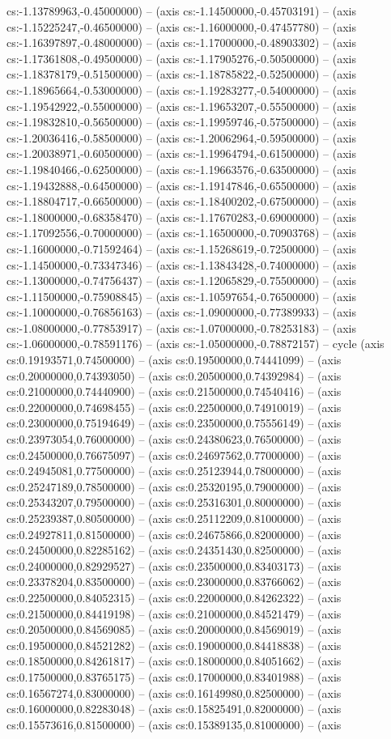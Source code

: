 cs:-1.13789963,-0.45000000) -- (axis cs:-1.14500000,-0.45703191) -- (axis cs:-1.15225247,-0.46500000) -- (axis cs:-1.16000000,-0.47457780) -- (axis cs:-1.16397897,-0.48000000) -- (axis cs:-1.17000000,-0.48903302) -- (axis cs:-1.17361808,-0.49500000) -- (axis cs:-1.17905276,-0.50500000) -- (axis cs:-1.18378179,-0.51500000) -- (axis cs:-1.18785822,-0.52500000) -- (axis cs:-1.18965664,-0.53000000) -- (axis cs:-1.19283277,-0.54000000) -- (axis cs:-1.19542922,-0.55000000) -- (axis cs:-1.19653207,-0.55500000) -- (axis cs:-1.19832810,-0.56500000) -- (axis cs:-1.19959746,-0.57500000) -- (axis cs:-1.20036416,-0.58500000) -- (axis cs:-1.20062964,-0.59500000) -- (axis cs:-1.20038971,-0.60500000) -- (axis cs:-1.19964794,-0.61500000) -- (axis cs:-1.19840466,-0.62500000) -- (axis cs:-1.19663576,-0.63500000) -- (axis cs:-1.19432888,-0.64500000) -- (axis cs:-1.19147846,-0.65500000) -- (axis cs:-1.18804717,-0.66500000) -- (axis cs:-1.18400202,-0.67500000) -- (axis cs:-1.18000000,-0.68358470) -- (axis cs:-1.17670283,-0.69000000) -- (axis cs:-1.17092556,-0.70000000) -- (axis cs:-1.16500000,-0.70903768) -- (axis cs:-1.16000000,-0.71592464) -- (axis cs:-1.15268619,-0.72500000) -- (axis cs:-1.14500000,-0.73347346) -- (axis cs:-1.13843428,-0.74000000) -- (axis cs:-1.13000000,-0.74756437) -- (axis cs:-1.12065829,-0.75500000) -- (axis cs:-1.11500000,-0.75908845) -- (axis cs:-1.10597654,-0.76500000) -- (axis cs:-1.10000000,-0.76856163) -- (axis cs:-1.09000000,-0.77389933) -- (axis cs:-1.08000000,-0.77853917) -- (axis cs:-1.07000000,-0.78253183) -- (axis cs:-1.06000000,-0.78591176) -- (axis cs:-1.05000000,-0.78872157) -- cycle (axis cs:0.19193571,0.74500000) -- (axis cs:0.19500000,0.74441099) -- (axis cs:0.20000000,0.74393050) -- (axis cs:0.20500000,0.74392984) -- (axis cs:0.21000000,0.74440900) -- (axis cs:0.21500000,0.74540416) -- (axis cs:0.22000000,0.74698455) -- (axis cs:0.22500000,0.74910019) -- (axis cs:0.23000000,0.75194649) -- (axis cs:0.23500000,0.75556149) -- (axis cs:0.23973054,0.76000000) -- (axis cs:0.24380623,0.76500000) -- (axis cs:0.24500000,0.76675097) -- (axis cs:0.24697562,0.77000000) -- (axis cs:0.24945081,0.77500000) -- (axis cs:0.25123944,0.78000000) -- (axis cs:0.25247189,0.78500000) -- (axis cs:0.25320195,0.79000000) -- (axis cs:0.25343207,0.79500000) -- (axis cs:0.25316301,0.80000000) -- (axis cs:0.25239387,0.80500000) -- (axis cs:0.25112209,0.81000000) -- (axis cs:0.24927811,0.81500000) -- (axis cs:0.24675866,0.82000000) -- (axis cs:0.24500000,0.82285162) -- (axis cs:0.24351430,0.82500000) -- (axis cs:0.24000000,0.82929527) -- (axis cs:0.23500000,0.83403173) -- (axis cs:0.23378204,0.83500000) -- (axis cs:0.23000000,0.83766062) -- (axis cs:0.22500000,0.84052315) -- (axis cs:0.22000000,0.84262322) -- (axis cs:0.21500000,0.84419198) -- (axis cs:0.21000000,0.84521479) -- (axis cs:0.20500000,0.84569085) -- (axis cs:0.20000000,0.84569019) -- (axis cs:0.19500000,0.84521282) -- (axis cs:0.19000000,0.84418838) -- (axis cs:0.18500000,0.84261817) -- (axis cs:0.18000000,0.84051662) -- (axis cs:0.17500000,0.83765175) -- (axis cs:0.17000000,0.83401988) -- (axis cs:0.16567274,0.83000000) -- (axis cs:0.16149980,0.82500000) -- (axis cs:0.16000000,0.82283048) -- (axis cs:0.15825491,0.82000000) -- (axis cs:0.15573616,0.81500000) -- (axis cs:0.15389135,0.81000000) -- (axis 